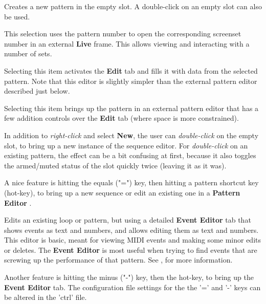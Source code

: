    \setcounter{ItemCounter}{0}      %

   Creates a new pattern in the empty slot.
   A double-click on an empty slot can also be used.

   This selection uses the pattern number to open the corresponding screenset
   number in an external \textbf{Live} frame.
   This allows viewing and interacting with a number of sets.

   Selecting this item activates the \textbf{Edit} tab and fills it with data
   from the selected pattern.
   Note that this editor is slightly simpler than the external pattern editor
   described just below.

   Selecting this item brings up the pattern in an external pattern editor that
   has a few addition controls over the \textbf{Edit} tab (where space is more
   constrained).

   In addition to \textsl{right-click} and select \textbf{New}, the user can
   \textsl{double-click} on the empty slot,
   to bring up a new instance of the sequence
   editor.  For \textsl{double-click} on an existing pattern,
   the effect can be a bit confusing at first,
   because it also toggles the armed/muted status of the slot
   quickly twice (leaving it as it was).


   A nice feature is hitting the equals ("=") key, then hitting
   a pattern shortcut key (hot-key), to bring up a new sequence or edit an
   existing one in a \textbf{Pattern Editor} .

   Edits an existing loop or pattern, but using a detailed \textbf{Event Editor}
   tab that shows events as text and numbers, and allows editing them as text
   and numbers.
   This editor is basic, meant for viewing
   MIDI events and making some minor edits or deletes.
   The \textbf{Event Editor} is most useful when trying to find events
   that are screwing up the performance of that pattern.
   See , for more information.

   Another feature is hitting the minus
   ("-") key, then the hot-key, to bring up the \textbf{Event Editor} tab.
   The configuration file settings for the the '=' and
   '-' keys can be altered in the 'ctrl' file.

